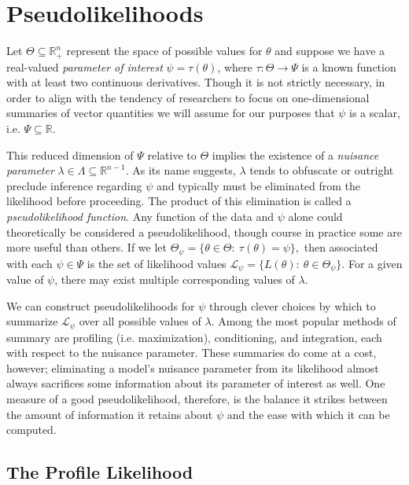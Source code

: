 \documentclass[
  12pt]{article}
\begin{document}
\section{Pseudolikelihoods}\label{pseudolikelihoods}

Let \(\Theta \subseteq \mathbb{R}^n_+\) represent the space of possible
values for \(\theta\) and suppose we have a real-valued \emph{parameter
of interest} \(\psi = \tau(\theta)\), where \(\tau: \Theta \to \Psi\) is
a known function with at least two continuous derivatives. Though it is
not strictly necessary, in order to align with the tendency of
researchers to focus on one-dimensional summaries of vector quantities
we will assume for our purposes that \(\psi\) is a scalar, i.e.
\(\Psi \subseteq \mathbb{R}\).

This reduced dimension of \(\Psi\) relative to \(\Theta\) implies the
existence of a \emph{nuisance parameter}
\(\lambda \in \Lambda \subseteq \mathbb{R}^{n-1}\). As its name
suggests, \(\lambda\) tends to obfuscate or outright preclude inference
regarding \(\psi\) and typically must be eliminated from the likelihood
before proceeding. The product of this elimination is called a
\emph{pseudolikelihood function}. Any function of the data and \(\psi\)
alone could theoretically be considered a pseudolikelihood, though
course in practice some are more useful than others. If we let
\(\Theta_{\psi} = \{\theta \in \Theta: \> \tau(\theta) = \psi \},\) then
associated with each \(\psi \in \Psi\) is the set of likelihood values
\(\mathcal{L}_{\psi} = \{L(\theta): \> \theta \in \Theta_{\psi}\}.\) For
a given value of \(\psi\), there may exist multiple corresponding values
of \(\lambda\).

We can construct pseudolikelihoods for \(\psi\) through clever choices
by which to summarize \(\mathcal{L}_{\psi}\) over all possible values of
\(\lambda\). Among the most popular methods of summary are profiling
(i.e. maximization), conditioning, and integration, each with respect to
the nuisance parameter. These summaries do come at a cost, however;
eliminating a model's nuisance parameter from its likelihood almost
always sacrifices some information about its parameter of interest as
well. One measure of a good pseudolikelihood, therefore, is the balance
it strikes between the amount of information it retains about \(\psi\)
and the ease with which it can be computed.

\subsection{The Profile Likelihood}\label{the-profile-likelihood}
\end{document}
